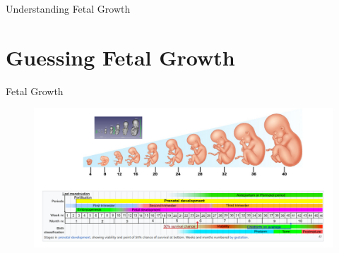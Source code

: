 

{
\begin{frame}{}

\BigSizeFont
Understanding Fetal Growth
\end{frame}
}




\section{Guessing Fetal Growth}



{
\begin{frame}{Fetal Growth}
      \begin{figure}
        \centering
        \includegraphics[width=1.0\textwidth]{./figures/fetal-growth/versions/drawing-v01v01.png}
      \end{figure}
\end{frame}
}



